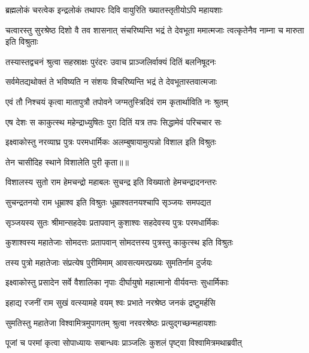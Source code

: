 \twolineshloka
{ब्रह्मलोकं चरत्वेक इन्द्रलोकं तथापरः}
{दिवि वायुरिति ख्यातस्तृतीयोऽपि महायशाः} %

\threelineshloka
{चत्वारस्तु सुरश्रेष्ठ दिशो वै तव शासनात्}
{संचरिष्यन्ति भद्रं ते देवभूता ममात्मजाः}
{त्वत्कृतेनैव नाम्ना च मारुता इति विश्रुताः} %

\twolineshloka
{तस्यास्तद्वचनं श्रुत्वा सहस्राक्षः पुरंदरः}
{उवाच प्राञ्जलिर्वाक्यं दितिं बलनिषूदनः} %

\twolineshloka
{सर्वमेतद्यथोक्तं ते भविष्यति न संशयः}
{विचरिष्यन्ति भद्रं ते देवभूतास्तवात्मजाः} %

\twolineshloka
{एवं तौ निश्चयं कृत्वा मातापुत्रौ तपोवने}
{जग्मतुस्त्रिदिवं राम कृतार्थाविति नः श्रुतम्} %

\twolineshloka
{एष देशः स काकुत्स्थ महेन्द्राध्युषितः पुरा}
{दितिं यत्र तपः सिद्धामेवं परिचचार सः} %

\twolineshloka
{इक्ष्वाकोस्तु नरव्याघ्र पुत्रः परमधार्मिकः}
{अलम्बुषायामुत्पन्नो विशाल इति विश्रुतः} %

{तेन चासीदिह स्थाने विशालेति पुरी कृता॥॥} %

\addtocounter{shlokacount}{1}

\twolineshloka
{विशालस्य सुतो राम हेमचन्द्रो महाबलः}
{सुचन्द्र इति विख्यातो हेमचन्द्रादनन्तरः} %

\twolineshloka
{सुचन्द्रतनयो राम धूम्राश्व इति विश्रुतः}
{धूम्राश्वतनयश्चापि सृञ्जयः समपद्यत} %

\twolineshloka
{सृञ्जयस्य सुतः श्रीमान्सहदेवः प्रतापवान्}
{कुशाश्वः सहदेवस्य पुत्रः परमधार्मिकः} %

\twolineshloka
{कुशाश्वस्य महातेजाः सोमदत्तः प्रतापवान्}
{सोमदत्तस्य पुत्रस्तु काकुत्स्थ इति विश्रुतः} %

\twolineshloka
{तस्य पुत्रो महातेजाः संप्रत्येष पुरीमिमाम्}
{आवसत्यमरप्रख्यः सुमतिर्नाम दुर्जयः} %

\twolineshloka
{इक्ष्वाकोस्तु प्रसादेन सर्वे वैशालिका नृपाः}
{दीर्घायुषो महात्मानो वीर्यवन्तः सुधार्मिकाः} %

\twolineshloka
{इहाद्य रजनीं राम सुखं वत्स्यामहे वयम्}
{श्वः प्रभाते नरश्रेष्ठ जनकं द्रष्टुमर्हसि} %

\twolineshloka
{सुमतिस्तु महातेजा विश्वामित्रमुपागतम्}
{श्रुत्वा नरवरश्रेष्ठः प्रत्युद्गच्छन्महायशाः} %

\twolineshloka
{पूजां च परमां कृत्वा सोपाध्यायः सबान्धवः}
{प्राञ्जलिः कुशलं पृष्ट्वा विश्वामित्रमथाब्रवीत्} %

